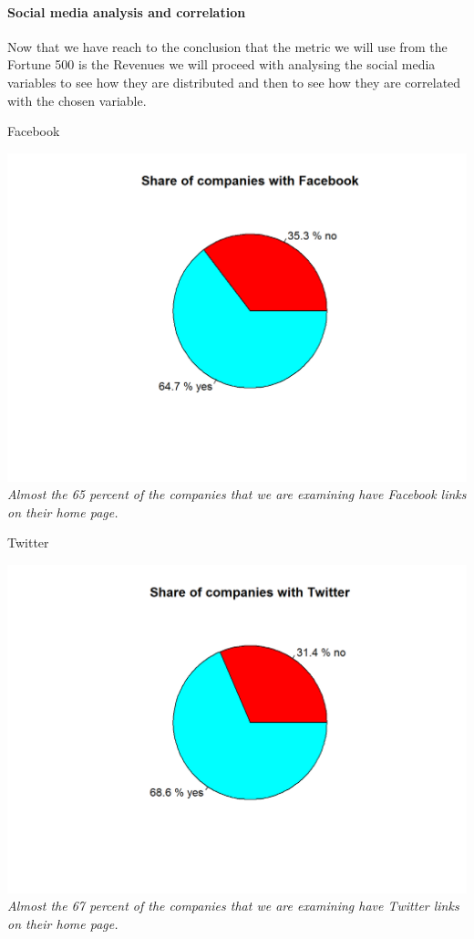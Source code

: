 \documentclass{article}
\begin{document}
\paragraph{Social media analysis and correlation}
Now that we have reach to the conclusion that the metric we will use from the Fortune 500 is the Revenues we will proceed with analysing the social media variables to see how they are distributed and then to see how they are correlated with the chosen variable.\\
\begin{table}[H]
\centering
\caption{Facebook}
\begin{center}
\includegraphics[scale=0.5]{../R/photos/10_facebook_dist.png}   \\
\textit{Almost the 65 percent of the companies that we are examining have Facebook links on their home page.}
\end{center}
\end{table}

\begin{table}[H]
\centering
\caption{Twitter}
\begin{center}
\includegraphics[scale=0.5]{../R/photos/12_tw_dist.png}  \\
\textit{Almost the 67 percent of the companies that we are examining have Twitter links on their home page.}
\end{center}
\end{table}
\end{document}
